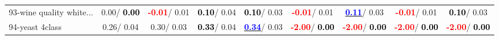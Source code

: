 \begin{table}[h]
\begin{center}
\begin{tabular}{lc|c|c|c|c|c|c|c}
93-wine quality white... &   0.00/\textcolor{black}{\textbf{  0.00}} & \textcolor{red}{\textbf{ -0.01}}/  0.01 & \textcolor{black}{\textbf{  0.10}}/  0.04 & \textcolor{black}{\textbf{  0.10}}/  0.03 & \textcolor{red}{\textbf{ -0.01}}/  0.01 & \underline{\textcolor{blue}{\textbf{  0.11}}}/  0.03 & \textcolor{red}{\textbf{ -0.01}}/  0.01 & \textcolor{black}{\textbf{  0.10}}/  0.03 \\
94-yeast 4class &   0.26/  0.04 &   0.30/  0.03 & \textcolor{black}{\textbf{  0.33}}/  0.04 & \underline{\textcolor{blue}{\textbf{  0.34}}}/  0.03 & \textcolor{red}{\textbf{ -2.00}}/\textcolor{black}{\textbf{  0.00}} & \textcolor{red}{\textbf{ -2.00}}/\textcolor{black}{\textbf{  0.00}} & \textcolor{red}{\textbf{ -2.00}}/\textcolor{black}{\textbf{  0.00}} & \textcolor{red}{\textbf{ -2.00}}/\textcolor{black}{\textbf{  0.00}} \\\end{tabular}\label{stratsALCKappa2bSVM}
\end{center}
\end{table}